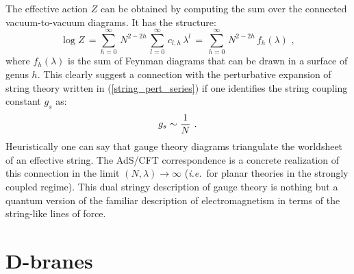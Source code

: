 \documentclass[12pt,notitlepage]{article}
\newcommand{\beq}{\begin{equation}}
\newcommand{\eeq}{\end{equation}}
\def\ie{{\emph{i.e.}}}
\begin{document}
The effective action $Z$ can be obtained by computing the sum over the connected vacuum-to-vacuum diagrams. It has the structure:
\beq
\log Z\,=\sum_{h=0}^{\infty}\,N^{2-2h}\,
\sum_{l=0}^{\infty}\,c_{l,h}\,\lambda^{l}\,=\,
\sum_{h=0}^{\infty}\,N^{2-2h}\,f_h(\lambda)\,\,,
\eeq
where $f_h(\lambda)$ is the sum of Feynman diagrams that can be drawn in a surface of genus $h$. This clearly suggest a connection with the perturbative expansion of  string theory  written in (\ref{string_pert_series}) if one identifies the string coupling constant $g_s$ as:
\beq
g_s\sim {1\over N}\,\,.
\eeq
Heuristically one can say that gauge theory diagrams triangulate the worldsheet of an effective string. 
The AdS/CFT correspondence is a concrete realization of this connection in the limit $(N, \lambda)\to\infty$ (\ie\ for planar theories in the strongly coupled regime). This dual stringy description of gauge theory is nothing but a quantum version of the familiar description of electromagnetism in terms of the string-like lines of force. 

\section{D-branes}
\end{document}
